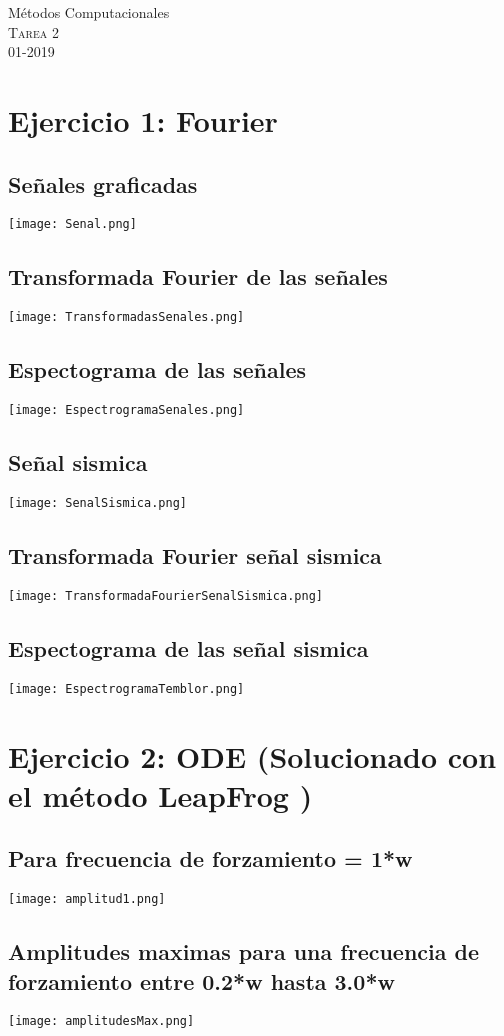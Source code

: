 \documentclass[11pt,letterpaper]{exam}
\begin{document}
\begin{center}
{\Large Métodos Computacionales} \\
\textsc{Tarea 2}\\
01-2019\\
\end{center}

\noindent

\section{Ejercicio 1: Fourier}

\subsection{ Señales graficadas}
\texttt{[image: Senal.png]}

\subsection{ Transformada Fourier de las señales}
\texttt{[image: TransformadasSenales.png]}

\subsection{ Espectograma de las señales}
\texttt{[image: EspectrogramaSenales.png]}

\subsection{ Señal sismica}
\texttt{[image: SenalSismica.png]}

\subsection{ Transformada Fourier señal sismica}
\texttt{[image: TransformadaFourierSenalSismica.png]}

\subsection{ Espectograma de las señal sismica}
\texttt{[image: EspectrogramaTemblor.png]}


\section{Ejercicio 2: ODE (Solucionado con el método LeapFrog )}

\subsection{ Para frecuencia de forzamiento = 1*w}
\texttt{[image: amplitud1.png]}

\subsection{ Amplitudes maximas para una frecuencia de forzamiento entre 0.2*w hasta 3.0*w}
\texttt{[image: amplitudesMax.png]}

\end{document}
